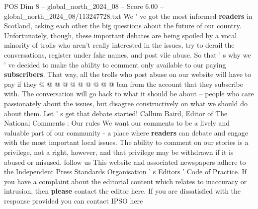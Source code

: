 \begin{textsample}{POS Dim 8 – global\_north\_2024\_08 – Score 6.00 – global\_north\_2024\_08/113247728.txt}
We ' ve got the most informed \textbf{readers} in Scotland, asking each other the big questions about the future of our country.
Unfortunately, though, these important debates are being spoiled by a vocal minority of trolls who aren't really interested in the issues, try to derail the conversations, register under fake names, and post vile abuse.
So that ' s why we ' ve decided to make the ability to comment only available to our paying \textbf{subscribers}.
That way, all the trolls who post abuse on our website will have to pay if they @ @ @ @ @ @ @ @ @ @ ban from the account that they subscribe with.
The conversation will go back to what it should be about -- people who care passionately about the issues, but disagree constructively on what we should do about them.
Let ' s get that debate started!
Callum Baird, Editor of The National Comments : Our rules We want our comments to be a lively and valuable part of our community - a place where \textbf{readers} can debate and engage with the most important local issues.
The ability to comment on our stories is a privilege, not a right, however, and that privilege may be withdrawn if it is abused or misused. follow us This website and associated newspapers adhere to the Independent Press Standards Organisation ' s Editors ' Code of Practice.
If you have a complaint about the editorial content which relates to inaccuracy or intrusion, then \textbf{please} contact the editor here.
If you are dissatisfied with the response provided you can contact IPSO here

\end{textsample}

